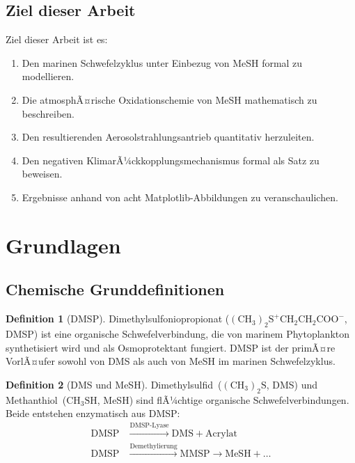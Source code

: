 ﻿\documentclass[a4paper,12pt]{article}
\theoremstyle{definition}
\newtheorem{definition}{Definition}
\begin{document}
\subsection{Ziel dieser Arbeit}

Ziel dieser Arbeit ist es:
\begin{enumerate}
  \item Den marinen Schwefelzyklus unter Einbezug von MeSH formal zu modellieren.
  \item Die atmosphÃ¤rische Oxidationschemie von MeSH mathematisch zu beschreiben.
  \item Den resultierenden Aerosolstrahlungsantrieb quantitativ herzuleiten.
  \item Den negativen KlimarÃ¼ckkopplungsmechanismus formal als Satz zu beweisen.
  \item Ergebnisse anhand von acht Matplotlib-Abbildungen zu veranschaulichen.
\end{enumerate}

\section{Grundlagen}

\subsection{Chemische Grunddefinitionen}

\begin{definition}[DMSP]
  Dimethylsulfoniopropionat (\(\mathrm{(CH_3)_2S^+CH_2CH_2COO^-}\), DMSP) ist eine organische
  Schwefelverbindung, die von marinem Phytoplankton synthetisiert wird und als Osmoprotektant
  fungiert. DMSP ist der primÃ¤re VorlÃ¤ufer sowohl von DMS als auch von MeSH im marinen
  Schwefelzyklus.
\end{definition}

\begin{definition}[DMS und MeSH]
  Dimethylsulfid~(\(\mathrm{(CH_3)_2S}\), DMS) und Methanthiol~(\(\mathrm{CH_3SH}\), MeSH) sind
  flÃ¼chtige organische Schwefelverbindungen. Beide entstehen enzymatisch aus DMSP:
  \begin{align}
    \mathrm{DMSP} &\xrightarrow{\text{DMSP-Lyase}} \mathrm{DMS} + \mathrm{Acrylat} \label{eq:dms_formation}\\
    \mathrm{DMSP} &\xrightarrow{\text{Demethylierung}} \mathrm{MMSP} \xrightarrow{} \mathrm{MeSH} + \ldots \label{eq:mesh_formation}
  \end{align}
\end{definition}
\end{document}
